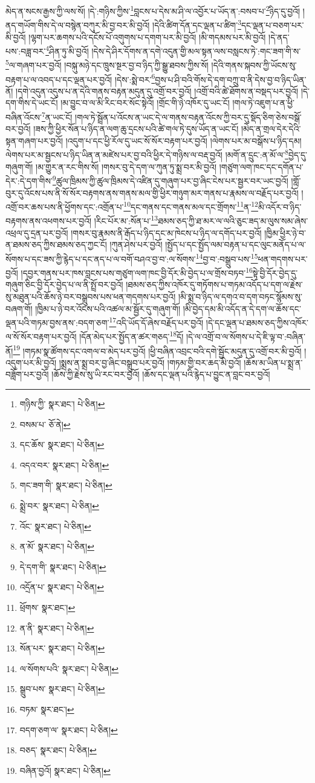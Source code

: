 མེད་ན་སངས་རྒྱས་ཀྱི་ལས་སོ། །དེ་:གཉིས་ཀྱིས་\footnote{གཉིས་ཀྱི་  སྣར་ཐང་།  པེ་ཅིན། }བླངས་པ་དེས་མ་ཤི་ལ་འབྱོར་པ་ཡོད་ན་:བསབ་པ་\footnote{བསམ་པ་  ཅོ་ནེ། }ཉིད་དུ་བྱའོ། །ནད་གཡོག་གིས་དེ་ལ་བསྙེན་བཀུར་མི་བྱ་བར་མི་བྱའོ། །དེའི་ཚིག་དོན་དང་ལྡན་པ་ཚིག་\footnote{དང་ཆོས་  སྣར་ཐང་།  པེ་ཅིན། }དང་ལྡན་པ་བཅག་པར་མི་བྱའོ། །ལྷག་པར་ཆགས་པའི་དངོས་པོ་འགུགས་པ་དགག་པར་མི་བྱའོ། །མི་གདམས་པར་མི་བྱའོ། །དེ་ནད་པས་:བཟླ་བར་\footnote{འདའ་བར་  སྣར་ཐང་།  པེ་ཅིན། }ཤིན་ཏུ་མི་བྱའོ། །དེས་དེ་ཤིར་དོགས་ན་དགེ་འདུན་གྱི་མལ་སྟན་ལས་བསླངས་ཏེ་:གང་ཟག་གི་ས་\footnote{གང་ཟག་གི་  སྣར་ཐང་།  པེ་ཅིན། }ལ་གཞག་པར་བྱའོ། །བསྐུ་མཉེ་དང་ཁྲུས་སྔར་བྱ་བ་ཉིད་ཀྱི་སྒྱུ་ཐབས་ཀྱིས་སོ། །དེའི་གནས་སྐབས་ཀྱི་ཡོངས་སུ་བརྟག་པ་ལ་འབད་པ་དང་ལྡན་པར་བྱའོ། །དེས་:སྨེ་བར་\footnote{སྨྲེ་བར་  སྣར་ཐང་།  པེ་ཅིན། }བྱས་པ་ཤི་བའི་གོས་དེ་དག་བཀྲུ་བ་ནི་དེས་བྱ་བ་ཉིད་ཡིན་ནོ། །དགེ་འདུན་འདུས་པ་ན་དེའི་གནས་བརྟན་མདུན་དུ་འགྲོ་བར་བྱའོ། །འགྲོ་བའི་ཚེ་ཐོགས་ན་བསྡད་པར་བྱའོ། །དེ་དག་གིས་དེ་ཡང་ངོ། །མ་བྱུང་བ་ལ་མི་རིང་བར་སོང་སྟེའོ། །གྲོང་གི་ཉེ་འཁོར་དུ་ཡང་ངོ། །གལ་ཏེ་འཇུག་པ་ན་ཕྱི་བཞིན་འོངས་\footnote{འོང་  སྣར་ཐང་།  པེ་ཅིན། }ན་ཡང་ངོ། །གལ་ཏེ་སྦྲོན་པ་འོངས་ན་ཡང་དེ་ལ་གནས་བརྟན་འོངས་ཀྱི་བར་དུ་སྡོད་ཅིག་ཅེས་བསྒོ་བར་བྱའོ། །ཟས་ཀྱི་ཕྱིར་སོན་པ་ཉིད་ན་ལག་ཆུ་དྲངས་པའི་ཚེ་གལ་ཏེ་དུས་ཡོད་ན་ཡང་ངོ། །མེད་ན་གྲལ་དེར་དེའི་སྟན་གཞག་པར་བྱའོ། །འདུག་པ་དང་ཕྱི་རོལ་དུ་ཡང་སོ་སོར་བརྟག་པར་བྱའོ། །ལེགས་པར་མ་བསྒོས་པ་ཉིད་དམ། ལེགས་པར་མ་སྦྱངས་པ་ཉིད་ཡིན་ན་མཛེས་པར་བྱ་བའི་ཕྱིར་དེ་གཉིས་ལ་བརྡ་བྱའོ། །མགོ་ན་དྲུང་:ན་མོ་ལ་\footnote{ན་མོ་  སྣར་ཐང་།  པེ་ཅིན། }བྱེད་དུ་གཞུག་གོ། །མ་གྱུར་ན་རང་གིས་སོ། །གསར་བུ་དེ་དག་ལ་ཀུན་ཏུ་སྨྲ་བར་མི་བྱའོ། །གཙུག་ལག་ཁང་དང་དགོན་པ་དེར་:དེ་དག་གིས་\footnote{དེ་དག་གི་  སྣར་ཐང་།  པེ་ཅིན། }ཚུལ་ཁྲིམས་ཀྱི་ཚུལ་ཁྲིམས་དེ་འཛིན་དུ་གཞུག་པར་བྱ་ཞིང་ངེས་པར་སྦྱར་བར་ཡང་བྱའོ། །གློ་བུར་དུ་འོངས་པས་ནི་སོ་སོར་བརྟགས་ནས་གནས་མལ་གྱི་ཕྱིར་གཉུག་མར་གནས་པ་རྣམས་ལ་བརྗོད་པར་བྱའོ། །འགྲོ་བར་ཆས་པས་ནི་ཕྱོགས་དང་:འགྲོན་པ་\footnote{འདྲོན་པ་  སྣར་ཐང་།  པེ་ཅིན། }དང་གནས་དང་གནས་མལ་དང་གྲོགས་\footnote{ཕྲོགས་  སྣར་ཐང་། }ན་\footnote{ན་ནི་  སྣར་ཐང་།  པེ་ཅིན། }མི་འདོར་བ་ཉིད་བརྟགས་ནས་འཕགས་པར་བྱའོ། །རིང་པོར་མ་:སོན་པ་\footnote{སོན་པར་  སྣར་ཐང་།  པེ་ཅིན། }ཐམས་ཅད་ཀྱི་ཐ་མར་ལ་ལའི་ཅུང་ཟད་མ་ལུས་སམ་ཞེས་འཕྲལ་དུ་དྲན་པར་བྱའོ། །གསར་བུ་རྣམས་ནི་རྒོད་པ་ཉིད་དང་མ་ཁེངས་པ་ཉིད་ལ་དགོད་པར་བྱའོ། །ཁྱིམ་ཕྱིར་ཉེ་བ་ན་ཐམས་ཅད་ཀྱིས་ཐམས་ཅད་ཀྱང་ངོ། །ཀུན་ཤེས་པར་བྱའོ། །སྤྱོད་པ་དང་སྤྱོད་ལམ་བརྟན་པ་དང་ལུང་མནོད་པ་ལ་སོགས་པ་དང་ཟས་ཀྱི་རྙེད་པ་དང་ནད་པ་ལ་བགོ་བཤའ་བྱ་བ་:ལ་སོགས་\footnote{ལ་སོགས་པའི་  སྣར་ཐང་།  པེ་ཅིན། }བྱ་བ་:བསྒྲུབ་པས་\footnote{སྒྲུབ་པས་  སྣར་ཐང་།  པེ་ཅིན། }ཕན་གདགས་པར་བྱའོ། །དབྱར་གནས་པར་ཁས་བླངས་པས་གཙུག་ལག་ཁང་བྱི་དོར་མི་བྱེད་པ་ལ་གྲོས་བཏབ་\footnote{བཏམ་  སྣར་ཐང་། }སྟེ་བྱི་དོར་བྱེད་དུ་གཞུག་ཅིང་བྱི་དོར་བྱེད་པ་ལ་ནི་སྤྲོ་བར་བྱའོ། །ཐམས་ཅད་ཀྱིས་འཁོར་དུ་གཏོགས་པ་གཏམ་འདོད་པ་དག་ལ་རྗེས་སུ་མཐུན་པའི་ཆོས་ཉེ་བར་བསྒྲུབས་པས་ཕན་གདགས་པར་བྱའོ། །མི་སྨྲ་བ་ཉིད་ལ་དགའ་བ་དག་བཏང་སྙོམས་སུ་བཞག་གོ། །ཁྱིམ་པ་ཉེ་བར་འོངས་པའི་འཚལ་མ་སྦྱོར་དུ་གཞུག་གོ། །མི་བྱེད་དམ་མི་འདོད་ན་དེ་དག་ལ་ཆོས་དང་ལྡན་པའི་གཏམ་བྱས་ནས་:བདག་ཅག་\footnote{བདག་ཅག་ལ་  སྣར་ཐང་།  པེ་ཅིན། }འདི་ཡོད་དོ་ཞེས་བརྗོད་པར་བྱའོ། །དེ་དང་ལྡན་པ་ཐམས་ཅད་ཀྱིས་འཁོར་ལ་སོ་སོར་བརྟག་པར་བྱའོ། །དོན་མེད་པར་སྤྱོད་ན་ཚར་གཅད་\footnote{བཅད་  སྣར་ཐང་།  པེ་ཅིན། }དོ། །དེ་ལ་འགྲོ་བ་ལ་སོགས་པ་དེ་ཇི་ལྟ་བ་:བཞིན་ནོ།\footnote{བཞིན་བྱའོ།  སྣར་ཐང་།  པེ་ཅིན། } །གཏམ་སྣ་ཚོགས་དང་འགལ་བ་མེད་པར་བྱའོ། །ཕྱི་བཞིན་འབྲང་བའི་དགེ་སྦྱོང་མདུན་དུ་འགྲོ་བར་མི་བྱའོ། །འདུག་པར་མི་བྱའོ། །སྨྲས་ན་སྨྲ་བར་བྱ་ཞིང་བསྒྲུབ་པར་བྱའོ། །གཏམ་གྱི་བར་ཆད་མི་བྱའོ། །ཆོས་མ་ཡིན་པ་སྨྲ་ན་བཟློག་པར་བྱའོ། །ཆོས་ཀྱི་རྗེས་སུ་ཡི་རང་བར་བྱའོ། །ཆོས་དང་ལྡན་པའི་རྙེད་པ་བྱུང་ན་བླང་བར་བྱའོ། 